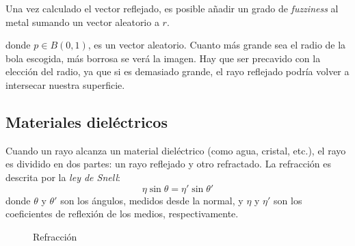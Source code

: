 \documentclass[12pt]{article}
\theoremstyle{definition}
\theoremstyle{remark}
\begin{document}
Una vez calculado el vector reflejado, es posible añadir un grado de \textit{fuzziness} al metal sumando un vector aleatorio a $r$. 

\begin{figure}[H]
\centering
{}
\end{figure}


donde $p\in B(0,1)$, es un vector aleatorio. Cuanto más grande sea el radio de la bola escogida, más borrosa se verá la imagen. Hay que ser precavido con la elección del radio, ya que si es demasiado grande, el rayo reflejado podría volver a intersecar nuestra superficie.

\subsection{Materiales dieléctricos}

Cuando un rayo alcanza un material dieléctrico (como agua, cristal, etc.), el rayo es dividido en dos partes: un rayo reflejado y otro refractado. La refracción es descrita por la \textit{ley de Snell}:
\[
\eta\sin\theta=\eta'\sin\theta'
\]
donde $\theta$ y $\theta'$ son los ángulos, medidos desde la normal, y $\eta$ y $\eta'$ son los coeficientes de reflexión de los medios, respectivamente.

\begin{figure}[H]
\centering
{}
\caption{Refracción}
\end{figure}
\end{document}

